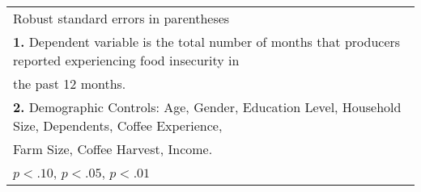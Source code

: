 \begin{table}[htbp]
\begin{tabular}{l*{4}{c}}
\bottomrule
\multicolumn{5}{l}{\footnotesize Robust standard errors in parentheses}\\
\multicolumn{5}{l}{\footnotesize \textbf{1.} Dependent variable is the total number of months that producers reported experiencing food insecurity in}\\
\multicolumn{5}{l}{\footnotesize the past 12 months.}\\
\multicolumn{5}{l}{\footnotesize \textbf{2.} Demographic Controls: Age, Gender, Education Level, Household Size, Dependents, Coffee Experience,}\\
\multicolumn{5}{l}{\footnotesize Farm Size, Coffee Harvest, Income.}\\
\multicolumn{5}{l}{\footnotesize \sym{*} \(p<.10\), \sym{**} \(p<.05\), \sym{***} \(p<.01\)}\\
\end{tabular}
\end{table}
